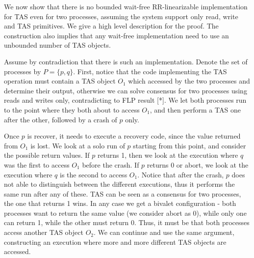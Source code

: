 \documentclass{article}
\begin{document}
We now show that there is no bounded wait-free RR-linearizable implementation for TAS even for two processes, assuming the system support only read, write and TAS primitives. We give a high level description for the proof. The construction also implies that any wait-free implementation need to use an unbounded number of TAS objects.

Assume by contradiction that there is such an implementation. Denote the set of processes by $P=\{p,q\}$. First, notice that the code implementing the TAS operation must contain a TAS object $O_1$ which accessed by the two processes and determine their output, otherwise we can solve consensus for two processes using reads and writes only, contradicting to FLP result [*]. We let both processes run to the point where they both about to access $O_1$, and then perform a TAS one after the other, followed by a crash of $p$ only.

Once $p$ is recover, it needs to execute a recovery code, since the value returned from $O_1$ is lost. We look at a solo run of $p$ starting from this point, and consider the possible return values. If $p$ returns 1, then we look at the execution where $q$ was the first to access $O_1$ before the crash. If $p$ returns 0 or abort, we look at the execution where $q$ is the second to access $O_1$. Notice that after the crash, $p$ does not able to distinguish between the different executions, thus it performs the same run after any of these. TAS can be seen as a consensus for two processes, the one that returns 1 wins. In any case we get a bivalet configuration - both processes want to return the same value (we consider abort as 0), while only one can return 1, while the other must return 0. Thus, it must be that both processes access another TAS object $O_2$. We can continue and use the same argument, constructing an execution where more and more different TAS objects are accessed.




 {}
\end{document}
